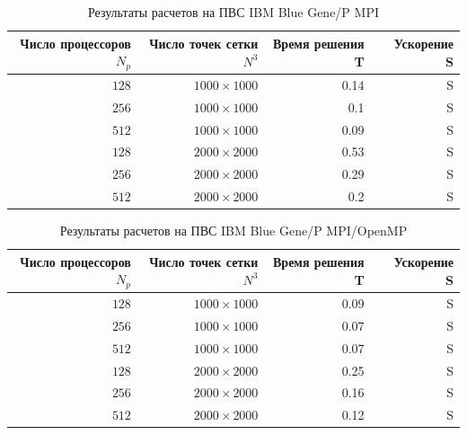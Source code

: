 \documentclass [12pt, a4paper] {article}
\begin{document}
\begin{table}
    \centering
    \caption{Результаты расчетов на ПВС IBM Blue Gene/P MPI}
    \begin{tabular}{|r|r|r|r|}
        \hline
        Число процессоров $N_p$ & Число точек сетки $N^3$ & Время решения T & \
            Ускорение S \\ \hline

        $128$ & $ 1000 \times 1000 $ & 0.14 & S \\ 
        $256$ & $ 1000 \times 1000 $ & 0.1 & S \\ 
        $512$ & $ 1000 \times 1000 $ & 0.09 & S \\ \hline

        $128$ & $ 2000 \times 2000 $ & 0.53 & S \\ 
        $256$ & $ 2000 \times 2000 $ & 0.29 & S \\ 
        $512$ & $ 2000 \times 2000 $ & 0.2 & S \\ \hline
    \end{tabular}
\end{table}
\begin{table}
    \centering
    \caption{Результаты расчетов на ПВС IBM Blue Gene/P MPI/OpenMP}
    \begin{tabular}{r|r|r|r}
    \hline
    Число процессоров $N_p$ & Число точек сетки $N^3$ & Время решения T & \
        Ускорение S \\ \hline

    $128$ & $ 1000 \times 1000 $ & 0.09 & S \\ 
    $256$ & $ 1000 \times 1000 $ & 0.07 & S \\ 
    $512$ & $ 1000 \times 1000 $ & 0.07 & S \\ \hline

    $128$ & $ 2000 \times 2000 $ & 0.25 & S \\ 
    $256$ & $ 2000 \times 2000 $ & 0.16 & S \\ 
    $512$ & $ 2000 \times 2000 $ & 0.12 & S \\
    \end{tabular}
\end{table}
\end{document}
